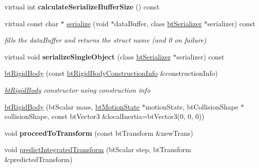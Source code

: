 \begin{DoxyCompactItemize}
\item 
\mbox{\label{classbtRigidBody_a565d91820b912febf3dc5acf850e1495}} 
virtual int {\bfseries calculate\+Serialize\+Buffer\+Size} () const
\item 
\mbox{\label{classbtRigidBody_a4f293343334b9736a6e7c41455abd46b}} 
virtual const char $\ast$ \hyperlink{classbtRigidBody_a4f293343334b9736a6e7c41455abd46b}{serialize} (void $\ast$data\+Buffer, class \hyperlink{classbtSerializer}{bt\+Serializer} $\ast$serializer) const
\begin{DoxyCompactList}\small\item\em fills the data\+Buffer and returns the struct name (and 0 on failure) \end{DoxyCompactList}\item 
\mbox{\label{classbtRigidBody_a1e2811e4b3d0ea4e07e9fa933d6fda08}} 
virtual void {\bfseries serialize\+Single\+Object} (class \hyperlink{classbtSerializer}{bt\+Serializer} $\ast$serializer) const
\item 
\mbox{\label{classbtRigidBody_a66a55c268281f64e849851a929449ffd}} 
\hyperlink{classbtRigidBody_a66a55c268281f64e849851a929449ffd}{bt\+Rigid\+Body} (const \hyperlink{structbtRigidBody_1_1btRigidBodyConstructionInfo}{bt\+Rigid\+Body\+Construction\+Info} \&construction\+Info)
\begin{DoxyCompactList}\small\item\em \hyperlink{classbtRigidBody}{bt\+Rigid\+Body} constructor using construction info \end{DoxyCompactList}\item 
\hyperlink{classbtRigidBody_aac9b7d050bc87644d38e9ffe4fe4c5ab}{bt\+Rigid\+Body} (bt\+Scalar mass, \hyperlink{classbtMotionState}{bt\+Motion\+State} $\ast$motion\+State, bt\+Collision\+Shape $\ast$collision\+Shape, const bt\+Vector3 \&local\+Inertia=bt\+Vector3(0, 0, 0))
\item 
\mbox{\label{classbtRigidBody_a70f38cd1bb359db4992a374da778bac7}} 
void {\bfseries proceed\+To\+Transform} (const bt\+Transform \&new\+Trans)
\item 
\mbox{\label{classbtRigidBody_af7f9b40d0abcfe9927d2e9c011947cec}} 
void \hyperlink{classbtRigidBody_af7f9b40d0abcfe9927d2e9c011947cec}{predict\+Integrated\+Transform} (bt\+Scalar step, bt\+Transform \&predicted\+Transform)

\end{DoxyCompactItemize}
